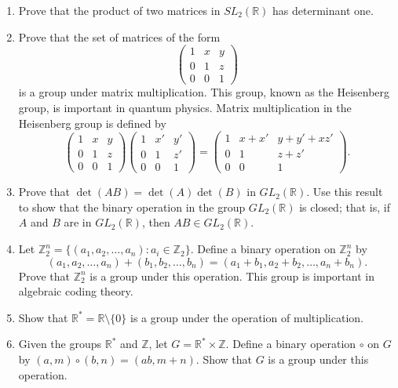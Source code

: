 {\begin{enumerate}
 
\item
Prove that the product of two matrices in $SL_2({\mathbb R})$ has
determinant one.
 
 
\item
Prove that the set of matrices of the form
\[
\begin{pmatrix}
1 & x & y \\
0 & 1 & z \\
0 & 0 & 1
\end{pmatrix}
\]
is a group under matrix multiplication.  This group, known as the
{\bfi Heisenberg group}, is important in
quantum physics.  Matrix multiplication in the Heisenberg group is
defined by  
\[
\begin{pmatrix}
1 & x & y \\
0 & 1 & z \\
0 & 0 & 1
\end{pmatrix}
\begin{pmatrix}
1 & x' & y' \\
0 & 1 & z' \\
0 & 0 & 1
\end{pmatrix}
=
\begin{pmatrix}
1 & x+x' & y+y'+xz' \\
0 & 1 & z+z' \\
0 & 0 & 1
\end{pmatrix}.
\]
 
 
\item %
Prove that $\det(AB) = \det(A) \det(B)$ in $GL_2({\mathbb R})$. Use this
result to show that the binary operation in the group $GL_2({\mathbb R})$
is closed; that is, if $A$ and $B$ are in $GL_2({\mathbb R})$, then $AB
\in GL_2({\mathbb R})$.
 
 
\item %
Let ${\mathbb Z}_2^n = \{ (a_1, a_2, \ldots, a_n) : a_i \in {\mathbb Z}_2
\}$. Define a binary operation on ${\mathbb Z}_2^n$ by
\[
(a_1, a_2, \ldots, a_n)
+
(b_1, b_2, \ldots, b_n)
=
(a_1+b_1, a_2+b_2, \ldots, a_n+b_n).
\]
Prove that ${\mathbb Z}_2^n$ is a group under this operation. This group
is important in algebraic coding theory. 
 
 
\item
Show that ${\mathbb R}^{\ast} = {\mathbb R} \setminus \{0 \}$ is a group
under the operation of multiplication. 
 
 
\item
Given the groups  ${\mathbb R}^{\ast}$ and ${\mathbb Z}$, let $G = {\mathbb
R}^{\ast}  \times {\mathbb Z}$. Define a binary operation $\circ$ on $G$
by $(a,m) \circ (b,n) = (ab, m+n)$. Show that $G$ is a group under
this operation. 
 

\end{enumerate}}

